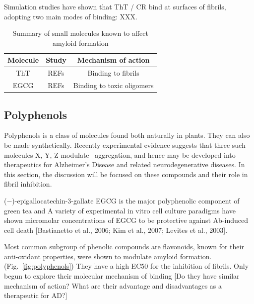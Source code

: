 Simulation studies have shown that ThT / CR bind at surfaces of fibrils, adopting two main modes of binding: XXX.\cite{XXX I'm thinking of the Chun Wu study from 2007, were there more?}

\begin{table}%
  \begin{center}
  \vspace{10pt}
  \caption{Summary of small molecules known to affect amyloid formation}
  \label{tbl:inhibitors}
    \begin{tabular}{| c | c | c |}
      \hline
      Molecule & Study & Mechanism of action \\
      \hline
      ThT & REFs & Binding to fibrils \\
      EGCG & REFs & Binding to toxic oligomers \\
	  \hline
    \end{tabular}
  \end{center}
\end{table}

\subsection{Polyphenols}
Polyphenols is a class of molecules found both naturally in plants. They can also be made synthetically. Recently experimental evidence suggests that three such molecules X, Y, Z modulate \abeta\ aggregation, and hence may be developed into therapeutics for Alzheimer's Disease and related neurodegenerative diseases.  In this section, the discussion will be focused on these compounds and their role in fibril inhibition.

(−)-epigallocatechin-3-gallate EGCG is the major polyphenolic component of green tea and  A variety of experimental in vitro cell culture paradigms have shown micromolar concentrations of EGCG to be protective against Ab-induced cell death [Bastianetto et al., 2006; Kim et al., 2007; Levites et al., 2003].

Most common subgroup of phenolic compounds are flavonoids, known for their anti-oxidant properties, were shown to modulate amyloid formation.(Fig.~\ref{fig:polyphenols})
They have a high EC50 for the inhibition of fibrils.  Only begun to explore their molecular mechanism of binding [Do they have similar mechanism of action? What are their advantage and disadvantages as a therapeutic for AD?]

